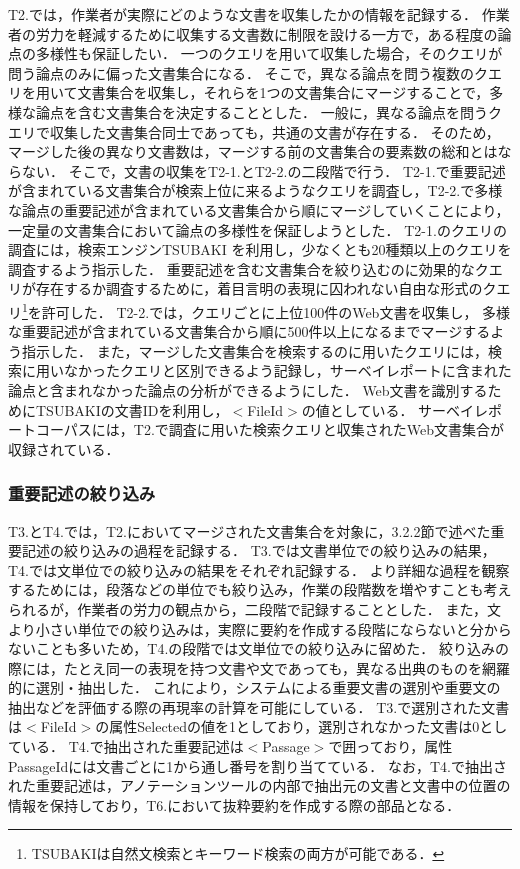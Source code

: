 \documentclass[japanese]{jnlp_1.4}
\begin{document}
T2.では，作業者が実際にどのような文書を収集したかの情報を記録する．
作業者の労力を軽減するために収集する文書数に制限を設ける一方で，ある程度の論点の多様性も保証したい．
{一つの}クエリを用いて収集した場合，そのクエリが問う論点のみに偏った文書集合になる．
そこで，異なる論点を問う複数のクエリを用いて文書集合を収集し，それらを1つの文書集合にマージすることで，多様な論点を含む文書集合を決定することとした．
一般に，異なる論点を問うクエリで収集した文書集合同士であっても，共通の文書が存在する．
そのため，マージした後の異なり文書数は，マージする前の文書集合の要素数の総和とはならない．
そこで，文書の収集をT2-1.とT2-2.の二段階で行う．
T2-1.で重要記述が含まれている文書集合が検索上位に来るようなクエリを調査し，T2-2.で多様な論点の重要記述が含まれている文書集合から順にマージしていくことにより，一定量の文書集合において論点の多様性を保証しようとした．
T2-1.のクエリの調査には，検索エンジンTSUBAKI \cite{Shinzato2008}を利用し，少なくとも20種類以上のクエリを調査するよう指示した．
重要記述を含む文書集合を絞り込むのに効果的なクエリが存在するか調査するために，着目言明の表現に囚われない自由な形式のクエリ\footnote{TSUBAKIは自然文検索とキーワード検索の両方が可能である．}を許可した．
T2-2.では，クエリごとに上位100件のWeb文書を収集し，
\pagebreak
多様な重要記述が含まれている文書集合から順に500件以上になるまでマージするよう指示した．
また，マージした文書集合を検索するのに用いたクエリには，検索に用いなかったクエリと区別できるよう記録し，サーベイレポートに含まれた論点と含まれなかった論点の分析ができるようにした．
Web文書を識別するためにTSUBAKIの文書IDを利用し，{\sf $<$FileId$>$}の値としている．
サーベイレポートコーパスには，T2.で調査に用いた検索クエリと収集されたWeb文書集合が収録されている．


\subsubsection{重要記述の絞り込み}

T3.とT4.では，T2.においてマージされた文書集合を対象に，3.2.2節で述べた重要記述の絞り込みの過程を記録する．
T3.では文書単位での絞り込みの結果，T4.では文単位での絞り込みの結果をそれぞれ記録する．
より詳細な過程を観察するためには，段落などの単位でも絞り込み，作業の段階数を増やすことも考えられるが，作業者の労力の観点から，二段階で記録することとした．
また，文より小さい単位での絞り込みは，実際に要約を作成する段階にならないと分からないことも多いため，T4.の段階では文単位での絞り込みに留めた．
絞り込みの際には，{たとえ}同一の表現を持つ文書や文であっても，異なる出典のものを網羅的に選別・抽出した．
これにより，システムによる重要文書の選別や重要文の抽出などを評価する際の再現率の計算を可能にしている．
T3.で選別された文書は{\sf $<$FileId$>$}の属性{\sf Selected}の値を1としており，選別されなかった文書は0としている．
T4.で抽出された重要記述は{\sf $<$Passage$>$}で囲っており，属性{\sf PassageId}には文書ごとに1から通し番号を割り当てている．
なお，T4.で抽出された重要記述は，アノテーションツールの内部で抽出元の文書と文書中の位置の情報を保持しており，T6.において抜粋要約を作成する際の部品となる．
\end{document}
